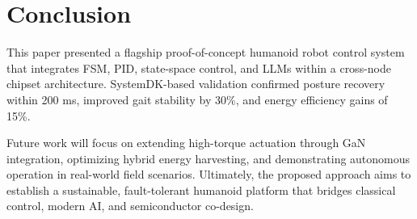 \section{Conclusion}
This paper presented a flagship proof-of-concept humanoid robot control system
that integrates FSM, PID, state-space control, and LLMs
within a cross-node chipset architecture.
SystemDK-based validation confirmed posture recovery within 200 ms,
improved gait stability by 30\%, and energy efficiency gains of 15\%.

Future work will focus on extending high-torque actuation
through GaN integration, optimizing hybrid energy harvesting,
and demonstrating autonomous operation in real-world field scenarios.
Ultimately, the proposed approach aims to establish
a sustainable, fault-tolerant humanoid platform
that bridges classical control, modern AI, and semiconductor co-design.
